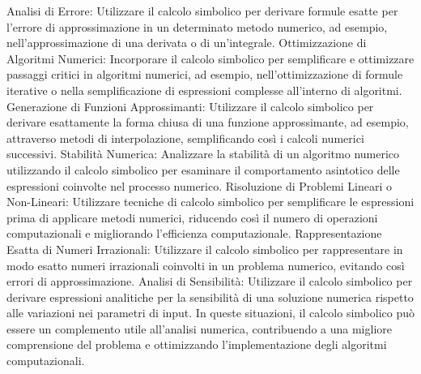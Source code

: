 Analisi di Errore:
Utilizzare il calcolo simbolico per derivare formule esatte per l'errore di approssimazione in un determinato metodo numerico, ad esempio, nell'approssimazione di una derivata o di un'integrale.
Ottimizzazione di Algoritmi Numerici:
Incorporare il calcolo simbolico per semplificare e ottimizzare passaggi critici in algoritmi numerici, ad esempio, nell'ottimizzazione di formule iterative o nella semplificazione di espressioni complesse all'interno di algoritmi.
Generazione di Funzioni Approssimanti:
Utilizzare il calcolo simbolico per derivare esattamente la forma chiusa di una funzione approssimante, ad esempio, attraverso metodi di interpolazione, semplificando così i calcoli numerici successivi.
Stabilità Numerica:
Analizzare la stabilità di un algoritmo numerico utilizzando il calcolo simbolico per esaminare il comportamento asintotico delle espressioni coinvolte nel processo numerico.
Risoluzione di Problemi Lineari o Non-Lineari:
Utilizzare tecniche di calcolo simbolico per semplificare le espressioni prima di applicare metodi numerici, riducendo così il numero di operazioni computazionali e migliorando l'efficienza computazionale.
Rappresentazione Esatta di Numeri Irrazionali:
Utilizzare il calcolo simbolico per rappresentare in modo esatto numeri irrazionali coinvolti in un problema numerico, evitando così errori di approssimazione.
Analisi di Sensibilità:
Utilizzare il calcolo simbolico per derivare espressioni analitiche per la sensibilità di una soluzione numerica rispetto alle variazioni nei parametri di input.
In queste situazioni, il calcolo simbolico può essere un complemento utile all'analisi numerica, contribuendo a una migliore comprensione del problema e ottimizzando l'implementazione degli algoritmi computazionali.